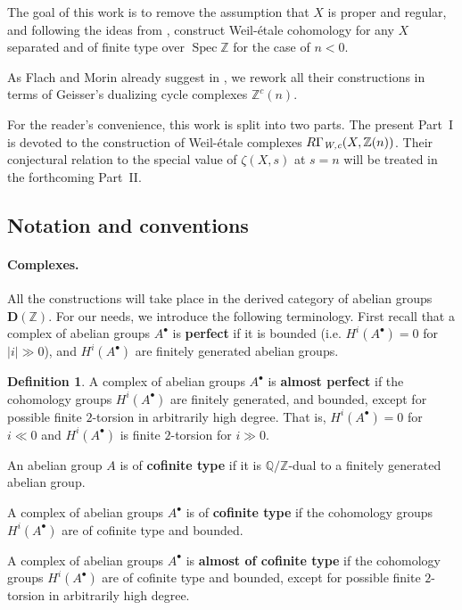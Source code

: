 \documentclass[draft,leqno,12pt]{article}
\theoremstyle{plain}
\theoremstyle{definition}
\newtheorem{definition}[theorem]{\indent\sc Definition}
\DeclareMathOperator{\Spec}{Spec}
\newcommand{\ZZ}{\mathbb{Z}}
\newcommand{\QQ}{\mathbb{Q}}
\newcommand{\Wc}{\text{\it W,c}}
\begin{document}
The goal of this work is to remove the assumption that $X$ is proper and
regular, and following the ideas from \cite{Flach-Morin-2018}, construct
Weil-\'{e}tale cohomology for any $X$ separated and of finite type over $\Spec\ZZ$
for the case of $n < 0$.

As Flach and Morin already suggest in \cite[Remark 3.11]{Flach-Morin-2018},
we rework all their constructions in terms of Geisser's dualizing cycle
complexes $\ZZ^c (n)$.

For the reader's convenience, this work is split into two parts. The present
Part~I is devoted to the construction of Weil-\'{e}tale complexes
$R\Gamma_\Wc (X, \ZZ (n))$. Their conjectural relation to the special value
of $\zeta (X,s)$ at $s = n$ will be treated in the forthcoming Part~II.

\subsection*{Notation and conventions}

\paragraph{Complexes.}
All the constructions will take place in the derived category of abelian groups
$\mathbf{D} (\ZZ)$. For our needs, we introduce the following terminology.
First recall that a complex of abelian groups $A^\bullet$ is \textbf{perfect} if
it is bounded (i.e. $H^i (A^\bullet) = 0$ for $|i| \gg 0$), and $H^i (A^\bullet)$
are finitely generated abelian groups.

\begin{definition}
  \label{dfn:almost-of-(co)finite-type}
  A complex of abelian groups $A^\bullet$ is \textbf{almost perfect}
  if the cohomology groups $H^i (A^\bullet)$ are finitely generated, and
  bounded, except for possible finite $2$-torsion in arbitrarily high degree.
  That is, $H^i (A^\bullet) = 0$ for $i \ll 0$ and $H^i (A^\bullet)$ is finite
  $2$-torsion for $i \gg 0$.

  An abelian group $A$ is of \textbf{cofinite type} if it is $\QQ/\ZZ$-dual to
  a finitely generated abelian group.

  A complex of abelian groups $A^\bullet$ is of \textbf{cofinite type} if the
  cohomology groups $H^i (A^\bullet)$ are of cofinite type and bounded.

  A complex of abelian groups $A^\bullet$ is \textbf{almost of cofinite type}
  if the cohomology groups $H^i (A^\bullet)$ are of cofinite type and
  bounded, except for possible finite $2$-torsion in arbitrarily high
  degree.
\end{definition}
\end{document}

